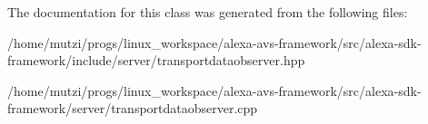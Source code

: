 The documentation for this class was generated from the following files\+:\begin{DoxyCompactItemize}
\item 
/home/mutzi/progs/linux\+\_\+workspace/alexa-\/avs-\/framework/src/alexa-\/sdk-\/framework/include/server/transportdataobserver.\+hpp\item 
/home/mutzi/progs/linux\+\_\+workspace/alexa-\/avs-\/framework/src/alexa-\/sdk-\/framework/server/transportdataobserver.\+cpp\end{DoxyCompactItemize}
